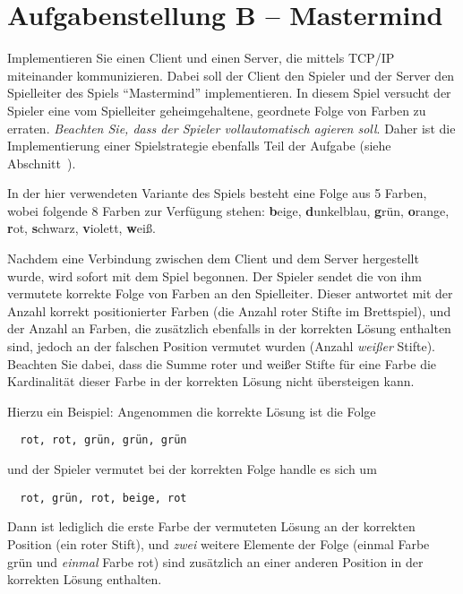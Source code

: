 

\usepackage{bytefield}




\section*{Aufgabenstellung B -- Mastermind}\label{sec:aufgabenstellung}
Implementieren Sie einen Client und einen Server, die mittels TCP/IP
miteinander kommunizieren. Dabei soll der Client den Spieler und der Server den
Spielleiter des Spiels ``Mastermind'' implementieren. In diesem Spiel versucht
der Spieler eine vom Spielleiter geheimgehaltene, geordnete Folge von Farben zu
erraten. \emph{Beachten Sie, dass der Spieler vollautomatisch agieren soll}. Daher
ist die Implementierung einer Spielstrategie ebenfalls Teil der Aufgabe
(siehe Abschnitt~).

In der hier verwendeten Variante des Spiels besteht eine Folge aus 5 Farben,
wobei folgende 8 Farben zur Verfügung stehen:
\textbf{b}eige,
\textbf{d}unkelblau,
\textbf{g}r\"un,
\textbf{o}range,
\textbf{r}ot,
\textbf{s}chwarz,
\textbf{v}iolett,
\textbf{w}eiß.

Nachdem eine Verbindung zwischen dem Client und dem Server hergestellt wurde,
wird sofort mit dem Spiel begonnen. Der Spieler sendet die von ihm vermutete
korrekte Folge von Farben an den Spielleiter. Dieser antwortet mit der Anzahl
korrekt positionierter Farben (die Anzahl roter Stifte im Brettspiel), und der
Anzahl an Farben, die zusätzlich ebenfalls in der korrekten Lösung enthalten
sind, jedoch an der falschen Position vermutet wurden (Anzahl \emph{weißer}
Stifte). Beachten Sie dabei, dass die Summe roter und weißer Stifte für eine
Farbe die Kardinalität dieser Farbe in der korrekten Lösung nicht übersteigen
kann.

Hierzu ein Beispiel: Angenommen die korrekte Lösung ist die Folge 
\begin{verbatim}
  rot, rot, grün, grün, grün
\end{verbatim}
und der Spieler vermutet bei der korrekten Folge handle es sich um
\begin{verbatim}
  rot, grün, rot, beige, rot
\end{verbatim}
Dann ist lediglich die erste Farbe der vermuteten Lösung an der korrekten
Position (ein roter Stift), und \emph{zwei} weitere Elemente der Folge (einmal
Farbe grün und \emph{einmal} Farbe rot) sind zusätzlich an einer anderen
Position in der korrekten Lösung enthalten.

